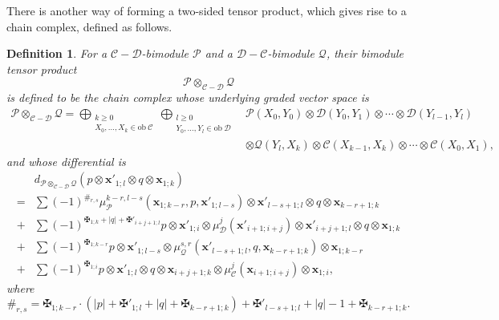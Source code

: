 \documentclass[11pt]{amsproc}
\def\cP{\mathcal{P}}
\def\cQ{\mathcal{Q}}
\def\cc{\mathcal{C}}
\def\dd{\mathcal{D}}
\def\ob{\mathrm{ob\ }}
\newtheorem{defn}[lem]{Definition}
\theoremstyle{remark}
\numberwithin{equation}{section}
\begin{document}
There is another way of forming a two-sided tensor product,
which gives rise to a chain complex, defined as follows.

\begin{defn}\label{def: bimodule tensor product}
For a $\cc-\dd$-bimodule $\cP$ and a $\dd-\cc$-bimodule $\cQ$, 
their bimodule tensor product
\begin{equation}
\cP \otimes_{\cc-\dd} \cQ
\end{equation}
is defined to be the chain complex whose underlying graded vector space is
\begin{equation}
\begin{split}
 \cP \otimes_{\cc-\dd} \cQ 
 = \bigoplus_{\substack{k \ge 0\\ X_{0}, \ldots, X_{k} \in \ob \cc}} \bigoplus_{\substack{l \ge 0\\ Y_{0}, \ldots, Y_{l} \in \ob \dd}} & \cP(X_{0}, Y_{0}) \otimes \dd(Y_{0}, Y_{1}) \otimes \cdots \otimes \dd(Y_{l-1}, Y_{l}) \\
& \otimes \cQ(Y_{l}, X_{k}) \otimes \cc(X_{k-1}, X_{k}) \otimes \cdots \otimes \cc(X_{0}, X_{1}),
\end{split}
\end{equation}
and whose differential is
\begin{equation}\label{bimodule tensor product differential}
\begin{split}
& d_{\cP \otimes_{\cc-\dd} \cQ}(p \otimes \mathbf{x}'_{1;l} \otimes q \otimes \mathbf{x}_{1;k}) \\
=  & \sum (-1)^{\#_{r,s}} \mu_{\cP}^{k-r, l-s}(\mathbf{x}_{1; k-r}, p, \mathbf{x}'_{1; l-s}) \otimes \mathbf{x}'_{l-s+1; l} \otimes q \otimes \mathbf{x}_{k-r+1; k} \\
+ & \sum (-1)^{\maltese_{1;k} + |q| + \maltese'_{i+j+1; l}} p \otimes \mathbf{x}'_{1; i} \otimes \mu_{\dd}^{j}(\mathbf{x}'_{i+1; i+j}) \otimes \mathbf{x}'_{i+j+1; l} \otimes q \otimes \mathbf{x}_{1; k} \\
+ & \sum (-1)^{\maltese_{1; k-r}} p \otimes \mathbf{x}'_{1; l-s} \otimes \mu_{\cQ}^{s, r}(\mathbf{x}'_{l-s+1; l}, q, \mathbf{x}_{k-r+1; k}) \otimes \mathbf{x}_{1; k-r} \\
+ & \sum (-1)^{\maltese_{1; i}} p \otimes \mathbf{x}'_{1; l} \otimes q \otimes \mathbf{x}_{i+j+1; k} \otimes \mu^{j}_{\cc}(\mathbf{x}_{i+1; i+j}) \otimes \mathbf{x}_{1; i},
\end{split}
\end{equation}
where
\begin{equation}
\#_{r, s} = \maltese_{1; k-r} \cdot (|p| + \maltese'_{1; l} + |q| + \maltese_{k-r+1; k}) + \maltese'_{l-s+1; l} + |q| - 1 + \maltese_{k-r+1; k}.
\end{equation}



\end{defn}
\end{document}
